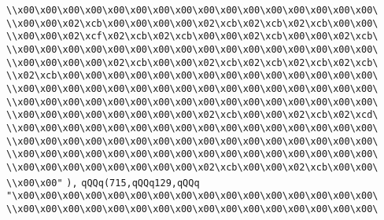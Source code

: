 \verb|\\x00\x00\x00\x00\x00\x00\x00\x00\x00\x00\x00\x00\x00\x00\x00\x00\|\newline
\verb|\\x00\x00\x02\xcb\x00\x00\x00\x00\x02\xcb\x02\xcb\x02\xcb\x00\x00\|\newline
\verb|\\x00\x00\x02\xcf\x02\xcb\x02\xcb\x00\x00\x02\xcb\x00\x00\x02\xcb\|\newline
\verb|\\x00\x00\x00\x00\x00\x00\x00\x00\x00\x00\x00\x00\x00\x00\x00\x00\|\newline
\verb|\\x00\x00\x00\x00\x02\xcb\x00\x00\x02\xcb\x02\xcb\x02\xcb\x02\xcb\|\newline
\verb|\\x02\xcb\x00\x00\x00\x00\x00\x00\x00\x00\x00\x00\x00\x00\x00\x00\|\newline
\verb|\\x00\x00\x00\x00\x00\x00\x00\x00\x00\x00\x00\x00\x00\x00\x00\x00\|\newline
\verb|\\x00\x00\x00\x00\x00\x00\x00\x00\x00\x00\x00\x00\x00\x00\x00\x00\|\newline
\verb|\\x00\x00\x00\x00\x00\x00\x00\x00\x02\xcb\x00\x00\x02\xcb\x02\xcd\|\newline
\verb|\\x00\x00\x00\x00\x00\x00\x00\x00\x00\x00\x00\x00\x00\x00\x00\x00\|\newline
\verb|\\x00\x00\x00\x00\x00\x00\x00\x00\x00\x00\x00\x00\x00\x00\x00\x00\|\newline
\verb|\\x00\x00\x00\x00\x00\x00\x00\x00\x00\x00\x00\x00\x00\x00\x00\x00\|\newline
\verb|\\x00\x00\x00\x00\x00\x00\x00\x00\x02\xcb\x00\x00\x02\xcb\x00\x00\|\newline
\verb|\\x00\x00"|\newline
\verb|),|\newline
\verb|qQQq(715,qQQq129,qQQq|\newline
\verb|"\x00\x00\x00\x00\x00\x00\x00\x00\x00\x00\x00\x00\x00\x00\x00\x00\|\newline
\verb|\\x00\x00\x00\x00\x00\x00\x00\x00\x00\x00\x00\x00\x00\x00\x00\x00\|\newline
